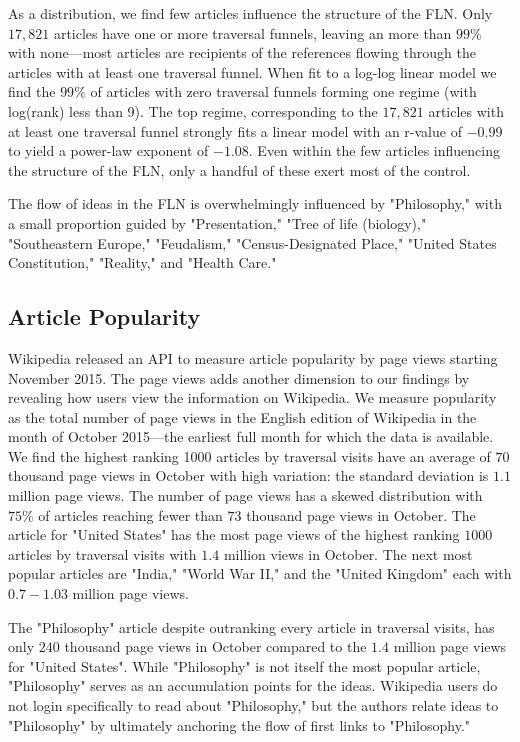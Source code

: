 \documentclass[pre,twocolumn,twoside,superscriptaddress,floatfix, aps, 10pt]{revtex4-1}
\begin{document}
As a distribution, we find few articles influence the structure of the 
FLN. Only $17, 821$ articles have one or more traversal funnels, leaving
an more than $99\%$ with none---most articles are recipients of 
the references flowing through the articles with at least one traversal funnel.
When fit to a log-log linear model we find the $99\%$ of articles with zero
traversal funnels forming one regime (with log(rank) less than 9).
The top regime, corresponding to the $17, 821$ articles with at least one 
traversal funnel strongly fits a linear model with an r-value of $-0.99$ 
to yield a power-law exponent of $-1.08$. Even within the few articles
influencing the structure of the FLN, only a handful of these exert most of the 
control. 

The flow of ideas in the FLN is overwhelmingly influenced by "Philosophy,"
with a small proportion guided by "Presentation," "Tree of life (biology)," "Southeastern Europe," 
"Feudalism," "Census-Designated Place," "United States Constitution," "Reality," and "Health Care."



\subsection{Article Popularity}

Wikipedia released an API to measure article popularity by page views
starting November 2015. The page views adds another dimension to our
findings by revealing 
how users view the information on Wikipedia. 
We measure popularity as the total number 
of page views in the English edition of Wikipedia in the month of 
October 2015---the earliest full month for which the data is available. 
We find the highest ranking 1000 articles by traversal visits have an average of
$70$ thousand page views in October with high variation: the standard deviation 
is $1.1$ million page views. 
The number of page views has a skewed distribution with $75\%$ of articles
reaching fewer than $73$ thousand page views in October.
The article for "United States" has the most page 
views of the highest ranking $1000$ articles by traversal visits with 
$1.4$ million views in October. The next most popular articles are 
"India," "World War II," and the "United Kingdom" each with $0.7-1.03$ million page views. 


The "Philosophy" article despite outranking every article in traversal visits,
has only $240$ thousand page views in October compared to the $1.4$ million
page views for "United States".
While "Philosophy" is not itself the most popular article, "Philosophy" serves as 
an accumulation points for the ideas. Wikipedia users do not login specifically
to read about "Philosophy," but the authors relate ideas to "Philosophy" 
by ultimately anchoring the flow of first links to "Philosophy."
\end{document}
